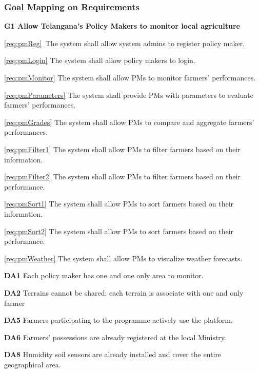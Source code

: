 \documentclass[10pt]{article}
\begin{document}
\subsubsection{Goal Mapping on Requirements}
\begin{description}
    \item \textbf{G1 Allow Telangana's Policy Makers to monitor local agriculture}
        \begin{description}
            \item \ref{req:pmReg}\ The system shall allow system admins to register policy maker.
            \item \ref{req:pmLogin} The system shall allow policy makers to login.
            \item \ref{req:pmMonitor} The system shall allow PMs to monitor farmers' performances.
            \item \ref{req:pmParameters} The system shall provide PMs with parameters to evaluate farmers' performances.
            \item \ref{req:pmGrades} The system shall allow PMs to compare and aggregate farmers' performances.
            \item \ref{req:pmFilter1} The system shall allow PMs to filter farmers based on their information.
            \item \ref{req:pmFilter2} The system shall allow PMs to filter farmers based on their performance.
            \item \ref{req:pmSort1} The system shall allow PMs to sort farmers based on their information.
            \item \ref{req:pmSort2} The system shall allow PMs to sort farmers based on their performance.
            \item \ref{req:pmWeather} The system shall allow PMs to visualize weather forecasts.
            \item \textbf{DA1} Each policy maker has one and one only area to monitor.
            \item \textbf{DA2} Terrains cannot be shared: each terrain is associate with one and only farmer
            \item \textbf{DA5} Farmers participating to the programme actively use the platform.
            \item \textbf{DA6} Farmers' possessions are already registered at the local Ministry.
            \item \textbf{DA8} Humidity soil sensors are already installed and cover the entire geographical area.

\end{description}
\end{description}
\end{document}
